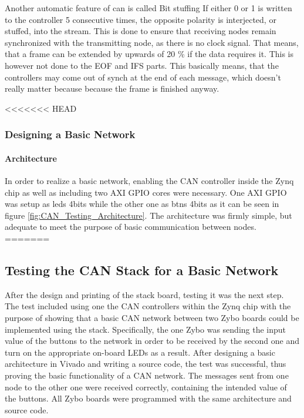 Another automatic feature of can is called Bit stuffing
If either 0 or 1 is written to the controller 5 consecutive times, the opposite polarity is interjected, or stuffed, into the stream. 
This is done to ensure that receiving nodes remain synchronized with the transmitting node, as there is no clock signal.
That means, that a frame can be extended by upwards of 20 \% if the data requires it.
This is however not done to the EOF and IFS parts.
This basically means, that the controllers may come out of synch at the end of each message, which doesn't really matter because because the frame is finished anyway.


<<<<<<< HEAD
\subsubsection{Designing a Basic Network}
\label{sub:TestingCANStack_BareMetal}

\paragraph{Architecture}
In order to realize a basic network, enabling the CAN controller inside the Zynq chip as well as including two AXI GPIO cores were necessary.
One AXI GPIO was setup as leds 4bits while the other one as btns 4bits as it can be seen in figure \ref{fig:CAN_Testing_Architecture}. The architecture was firmly simple, but adequate to meet the purpose of basic communication between nodes.
=======
\subsection{Testing the CAN Stack for a Basic Network}
\label{sub:TestingCANStack_BareMetal}

After the design and printing of the stack board, testing it was the next step.
The test included using one the CAN controllers within the Zynq chip with the purpose of showing that a basic CAN network between two Zybo boards could be implemented using the stack.
Specifically, the one Zybo was sending the input value of the buttons to the network in order to be received by the second one and turn on the appropriate on-board LEDs as a result.
After designing a basic architecture in Vivado and writing a source code, the test was successful, thus proving the basic functionality of a CAN network.
The messages sent from one node to the other one were received correctly, containing the intended value of the buttons. 
All Zybo boards were programmed with the same architecture and source code.

